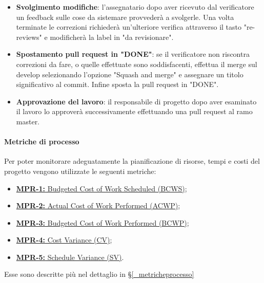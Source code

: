 \begin{itemize}
    \item \textbf{Svolgimento modifiche}: l'assegnatario dopo aver ricevuto dal verificatore un feedback sulle cose da sistemare provvederà a svolgerle. Una volta terminate le correzioni richiederà un'ulteriore verifica attraverso il tasto "re-reviews" e modificherà la label in "da revisionare".
    \item \textbf{Spostamento pull request in "DONE"}: se il verificatore non riscontra correzioni da fare, o quelle effettuate sono soddisfacenti, effettua il merge sul develop selezionando l'opzione "Squash and merge" e assegnare un titolo significativo al commit. Infine sposta la pull request in "DONE".
    \item \textbf{Approvazione del lavoro}: il responsabile di progetto dopo aver esaminato il lavoro lo approverà successivamente effettuando una pull request al ramo master.
\end{itemize}
\paragraph{Metriche di processo}
Per poter monitorare adeguatamente la pianificazione di risorse, tempi e costi del progetto vengono utilizzate le seguenti metriche:
\begin{itemize}
    \item \hyperref[_MPR-1]{\textbf{MPR-1:} Budgeted Cost of Work Scheduled (BCWS)};
    \item \hyperref[_MPR-2]{\textbf{MPR-2:} Actual Cost of Work Performed (ACWP)};
    \item \hyperref[_MPR-3]{\textbf{MPR-3:} Budgeted Cost of Work Performed (BCWP)};
    \item \hyperref[_MPR-4]{\textbf{MPR-4:} Cost Variance (CV)};
    \item \hyperref[_MPR-5]{\textbf{MPR-5:} Schedule Variance (SV)}.
\end{itemize}
Esse sono descritte più nel dettaglio in \S\ref{_metricheprocesso}
